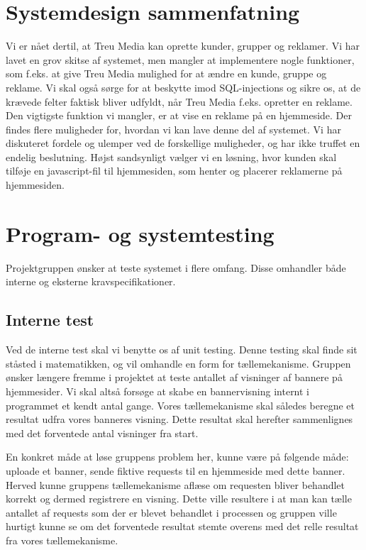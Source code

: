 \documentclass[a4paper,12pt]{article}
\begin{document}
\section{Systemdesign sammenfatning}
Vi er nået dertil, at Treu Media kan oprette kunder, grupper og reklamer. Vi har lavet en grov skitse af systemet, men mangler at implementere nogle funktioner, som f.eks. at give Treu Media mulighed for at ændre en kunde, gruppe og reklame. Vi skal også sørge for at beskytte imod SQL-injections og sikre os, at de krævede felter faktisk bliver udfyldt, når Treu Media f.eks. opretter en reklame. Den vigtigste funktion vi mangler, er at vise en reklame på en hjemmeside. Der findes flere muligheder for, hvordan vi kan lave denne del af systemet. Vi har diskuteret fordele og ulemper ved de forskellige muligheder, og har ikke truffet en endelig beslutning. Højst sandsynligt vælger vi en løsning, hvor kunden skal tilføje en javascript-fil til hjemmesiden, som henter og placerer reklamerne på hjemmesiden.

\section{Program- og systemtesting}

Projektgruppen ønsker at teste systemet i flere omfang. Disse omhandler både interne og eksterne kravspecifikationer.

\subsection{Interne test}
Ved de interne test skal vi benytte os af unit testing. Denne testing skal finde sit ståsted i matematikken, og vil omhandle en form for tællemekanisme. Gruppen ønsker længere fremme i projektet at teste antallet af visninger af bannere på hjemmesider. Vi skal altså forsøge at skabe en bannervisning internt i programmet et kendt antal gange. Vores tællemekanisme skal således beregne et resultat udfra vores banneres visning. Dette resultat skal herefter sammenlignes med det forventede antal visninger fra start.

En konkret måde at løse gruppens problem her, kunne være på følgende måde: uploade et banner, sende fiktive requests til en hjemmeside med dette banner. Herved kunne gruppens tællemekanisme aflæse om requesten bliver behandlet korrekt og dermed registrere en visning. Dette ville resultere i at man kan tælle antallet af requests som der er blevet behandlet i processen og gruppen ville hurtigt kunne se om det forventede resultat stemte overens med det relle resultat fra vores tællemekanisme.
\end{document}
